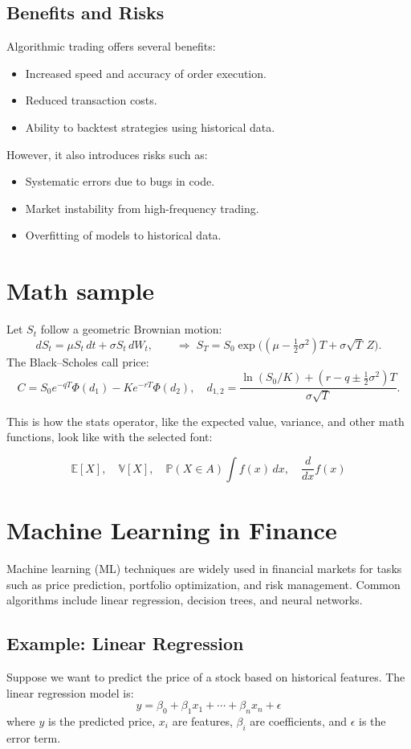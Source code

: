 \documentclass[10pt,a4paper]{article} %
\begin{document}
\subsection{Benefits and Risks}
Algorithmic trading offers several benefits:
\begin{itemize}
  \item Increased speed and accuracy of order execution.
  \item Reduced transaction costs.
  \item Ability to backtest strategies using historical data.
\end{itemize}
However, it also introduces risks such as:
\begin{itemize}
  \item Systematic errors due to bugs in code.
  \item Market instability from high-frequency trading.
  \item Overfitting of models to historical data.
\end{itemize}

\section{Math sample}
Let $S_t$ follow a geometric Brownian motion:
\[
  dS_t = \mu S_t\,dt + \sigma S_t\,dW_t,\qquad
  \Rightarrow\;
  S_T = S_0 \exp\!\Big((\mu-\tfrac{1}{2}\sigma^2)T+\sigma\sqrt{T}\,Z\Big).
\]
The Black--Scholes call price:
\[
  C = S_0 e^{-qT}\Phi(d_1)-K e^{-rT}\Phi(d_2),
  \quad d_{1,2}=\frac{\ln(S_0/K)+(r-q\pm\tfrac{1}{2}\sigma^2)T}{\sigma\sqrt{T}}.
\]

This is how the stats operator, like the expected value, variance, and other math functions, look like with the selected font:

\[
  \mathbb{E}[X], \quad \mathbb{V}[X], \quad \mathbb{P}(X \in A)
  \int f(x)\,dx, \quad \frac{d}{dx}f(x)
\]

\section{Machine Learning in Finance}
Machine learning (ML) techniques are widely used in financial markets for tasks such as price prediction, portfolio optimization, and risk management. Common algorithms include linear regression, decision trees, and neural networks.

\subsection{Example: Linear Regression}
Suppose we want to predict the price of a stock based on historical features. The linear regression model is:
\[
  y = \beta_0 + \beta_1 x_1 + \cdots + \beta_n x_n + \epsilon
\]
where $y$ is the predicted price, $x_i$ are features, $\beta_i$ are coefficients, and $\epsilon$ is the error term.
\end{document}

